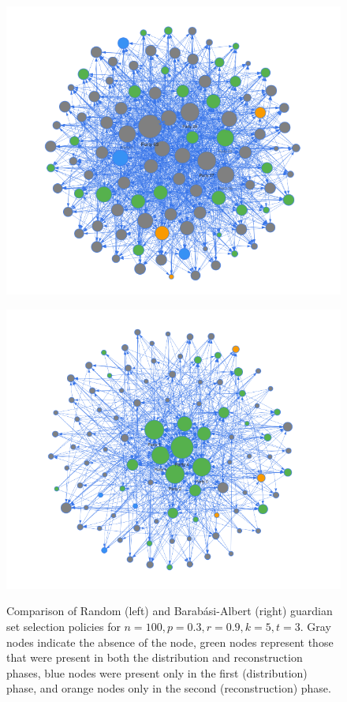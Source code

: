 \documentclass[lettersize,journal]{IEEEtran}
\theoremstyle{definition}
\begin{document}
\begin{figure}[h]
    \centering
    \begin{minipage}{0.24\textwidth}
        \centering
        \includegraphics[width=\textwidth]{Random_100nodes_30p_90r_3_of_5.png}
        \label{fig:random_100_30_90_3_5}
    \end{minipage}
    \hfill
    \begin{minipage}{0.24\textwidth}
        \centering
        \includegraphics[width=\textwidth]{BA_100nodes_30p_90r_3_of_5.png}
        \label{fig:example_ba_network}
    \end{minipage}
    
    \caption{Comparison of Random (left) and Barabási-Albert (right) guardian set selection policies for $n = 100, p=0.3, r=0.9, k=5, t=3$. Gray nodes indicate the absence of the node, green nodes represent those that were present in both the distribution and reconstruction phases, blue nodes were present only in the first (distribution) phase, and orange nodes only in the second (reconstruction) phase.}
    \label{fig:network_examples}
\end{figure}
\end{document}
